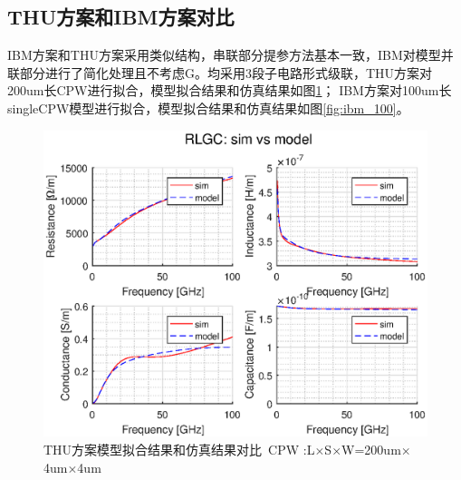 \documentclass[UTF8,a4paper,zihao=-4]{ctexart}
\begin{document}
\subsection{THU方案和IBM方案对比}
IBM方案和THU方案采用类似结构，串联部分提参方法基本一致，IBM对模型并联部分进行了简化处理且不考虑G。均采用3段子电路形式级联，THU方案对200um长CPW进行拟合，模型拟合结果和仿真结果如图\ref{fig:thu_200}；
IBM方案对100um长singleCPW模型进行拟合，模型拟合结果和仿真结果如图\ref{fig:ibm_100}。
\begin{figure}
  \centering
  \includegraphics[width=12cm]{mymodel_70um.eps}
  \caption{THU方案模型拟合结果和仿真结果对比\ CPW :L$\times$S$\times$W=200um$\times$4um$\times$4um}\label{fig:thu_200}
\end{figure}
\end{document}
